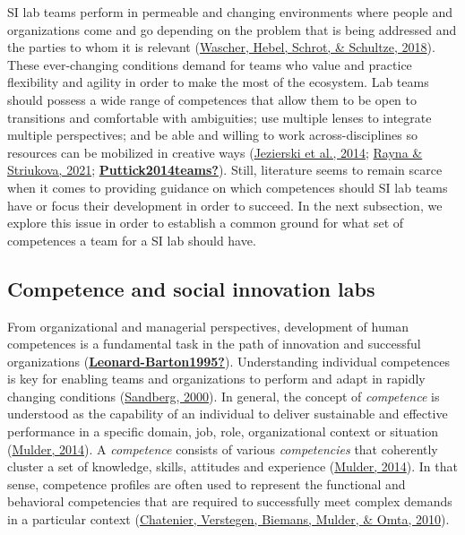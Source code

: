\documentclass[]{elsarticle} %
\begin{document}
SI lab teams perform in permeable and changing environments where people
and organizations come and go depending on the problem that is being
addressed and the parties to whom it is relevant
(\protect\hyperlink{ref-Wascher2018}{Wascher, Hebel, Schrot, \&
Schultze, 2018}). These ever-changing conditions demand for teams who
value and practice flexibility and agility in order to make the most of
the ecosystem. Lab teams should possess a wide range of competences that
allow them to be open to transitions and comfortable with ambiguities;
use multiple lenses to integrate multiple perspectives; and be able and
willing to work across-disciplines so resources can be mobilized in
creative ways (\protect\hyperlink{ref-Jezierski2014}{Jezierski et al.,
2014}; \protect\hyperlink{ref-Rayna2021}{Rayna \& Striukova, 2021};
\protect\hyperlink{ref-Puttick2014teams}{\textbf{Puttick2014teams?}}).
Still, literature seems to remain scarce when it comes to providing
guidance on which competences should SI lab teams have or focus their
development in order to succeed. In the next subsection, we explore this
issue in order to establish a common ground for what set of competences
a team for a SI lab should have.

\hypertarget{competence-and-social-innovation-labs}{%
\subsection{Competence and social innovation
labs}\label{competence-and-social-innovation-labs}}

From organizational and managerial perspectives, development of human
competences is a fundamental task in the path of innovation and
successful organizations
(\protect\hyperlink{ref-Leonard-Barton1995}{\textbf{Leonard-Barton1995?}}).
Understanding individual competences is key for enabling teams and
organizations to perform and adapt in rapidly changing conditions
(\protect\hyperlink{ref-Sandberg2000}{Sandberg, 2000}). In general, the
concept of \emph{competence} is understood as the capability of an
individual to deliver sustainable and effective performance in a
specific domain, job, role, organizational context or situation
(\protect\hyperlink{ref-Mulder2014}{Mulder, 2014}). A \emph{competence}
consists of various \emph{competencies} that coherently cluster a set of
knowledge, skills, attitudes and experience
(\protect\hyperlink{ref-Mulder2014}{Mulder, 2014}). In that sense,
competence profiles are often used to represent the functional and
behavioral competencies that are required to successfully meet complex
demands in a particular context
(\protect\hyperlink{ref-Chatenier2010}{Chatenier, Verstegen, Biemans,
Mulder, \& Omta, 2010}).
\end{document}
